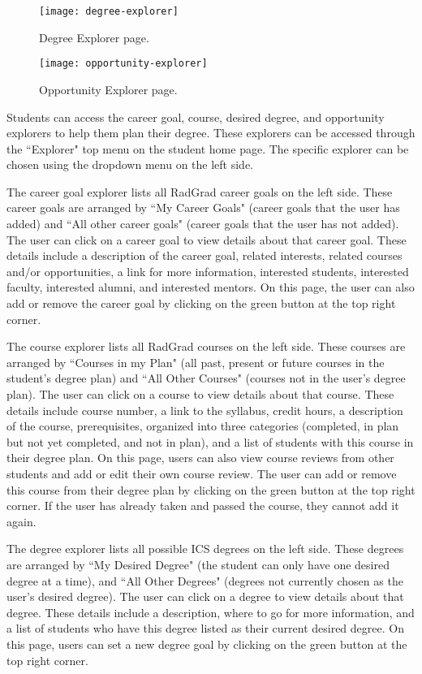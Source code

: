 \begin{figure}[h]
\centering
\texttt{[image: degree-explorer]}
\caption{Degree Explorer page.}
\end{figure}

\begin{figure}[h]
\centering
\texttt{[image: opportunity-explorer]}
\caption{Opportunity Explorer page.}
\end{figure}

Students can access the career goal, course, desired degree, and opportunity explorers to help them plan their degree.  These explorers can be accessed through the ``Explorer" top menu on the student home page. The specific explorer can be chosen using the dropdown menu on the left side. 

The career goal explorer lists all RadGrad career goals on the left side. These career goals are arranged by ``My Career Goals" (career goals that the user has added) and ``All other career goals" (career goals that the user has not added). The user can click on a career goal to view details about that career goal. These details include a description of the career goal, related interests, related courses and/or opportunities, a link for more information, interested students, interested faculty, interested alumni, and interested mentors. On this page, the user can also add or remove the career goal by clicking on the green button at the top right corner.  

The course explorer lists all RadGrad courses on the left side. These courses are arranged by ``Courses in my Plan" (all past, present or future courses in the student's degree plan) and ``All Other Courses" (courses not in the user's degree plan). The user can click on a course to view details about that course. These details include course number, a link to the syllabus, credit hours, a description of the course, prerequisites, organized into three categories (completed, in plan but not yet completed, and not in plan), and a list of students with this course in their degree plan. On this page, users can also view course reviews from other students and add or edit their own course review. The user can add or remove this course from their degree plan by clicking on the green button at the top right corner. If the user has already taken and passed the course, they cannot add it again.

The degree explorer lists all possible ICS degrees on the left side. These degrees are arranged by ``My Desired Degree" (the student can only have one desired degree at a time), and ``All Other Degrees" (degrees not currently chosen as the user's desired degree). The user can click on a degree to view details about that degree. These details include a description, where to go for more information, and a list of students who have this degree listed as their current desired degree. On this page, users can set a new degree goal by clicking on the green button at the top right corner.

